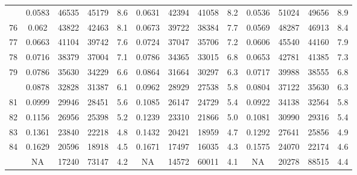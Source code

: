 \documentclass[
  14pt,
]{article}
\begin{document}
\begin{longtable}[t]{lcccccccccccc}
\addlinespace
75 & 0.0583 & 46535 & 45179 & 8.6 & 0.0631 & 42394 & 41058 & 8.2 & 0.0536 & 51024 & 49656 & 8.9\\
76 & 0.062 & 43822 & 42463 & 8.1 & 0.0673 & 39722 & 38384 & 7.7 & 0.0569 & 48287 & 46913 & 8.4\\
77 & 0.0663 & 41104 & 39742 & 7.6 & 0.0724 & 37047 & 35706 & 7.2 & 0.0606 & 45540 & 44160 & 7.9\\
78 & 0.0716 & 38379 & 37004 & 7.1 & 0.0786 & 34365 & 33015 & 6.8 & 0.0653 & 42781 & 41385 & 7.3\\
79 & 0.0786 & 35630 & 34229 & 6.6 & 0.0864 & 31664 & 30297 & 6.3 & 0.0717 & 39988 & 38555 & 6.8\\
\addlinespace
80 & 0.0878 & 32828 & 31387 & 6.1 & 0.0962 & 28929 & 27538 & 5.8 & 0.0804 & 37122 & 35630 & 6.3\\
81 & 0.0999 & 29946 & 28451 & 5.6 & 0.1085 & 26147 & 24729 & 5.4 & 0.0922 & 34138 & 32564 & 5.8\\
82 & 0.1156 & 26956 & 25398 & 5.2 & 0.1239 & 23310 & 21866 & 5.0 & 0.1081 & 30990 & 29316 & 5.4\\
83 & 0.1361 & 23840 & 22218 & 4.8 & 0.1432 & 20421 & 18959 & 4.7 & 0.1292 & 27641 & 25856 & 4.9\\
84 & 0.1629 & 20596 & 18918 & 4.5 & 0.1671 & 17497 & 16035 & 4.3 & 0.1575 & 24070 & 22174 & 4.6\\
\addlinespace
85 & NA & 17240 & 73147 & 4.2 & NA & 14572 & 60011 & 4.1 & NA & 20278 & 88515 & 4.4\\*
\end{longtable}
\end{document}
